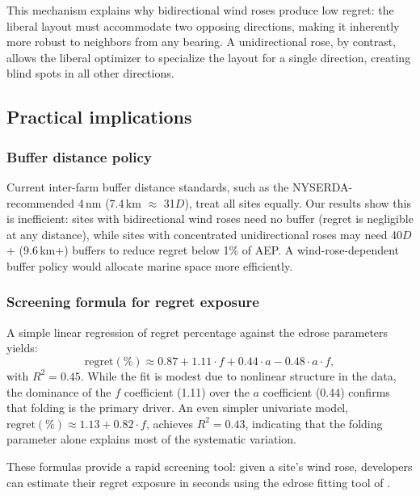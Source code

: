 \documentclass[manuscript, 12pt]{copernicus}
\begin{document}
This mechanism explains why bidirectional wind roses produce low regret: the liberal layout must accommodate two opposing directions, making it inherently more robust to neighbors from any bearing.
A unidirectional rose, by contrast, allows the liberal optimizer to specialize the layout for a single direction, creating blind spots in all other directions.

\subsection{Practical implications}

\subsubsection{Buffer distance policy}

Current inter-farm buffer distance standards, such as the NYSERDA-recommended 4\,nm (7.4\,km $\approx$ 31$D$), treat all sites equally.
Our results show this is inefficient: sites with bidirectional wind roses need no buffer (regret is negligible at any distance), while sites with concentrated unidirectional roses may need 40$D$+ (9.6\,km+) buffers to reduce regret below 1\% of AEP.
A wind-rose-dependent buffer policy would allocate marine space more efficiently.

\subsubsection{Screening formula for regret exposure}

A simple linear regression of regret percentage against the edrose parameters yields:
\begin{equation}\label{eq:regression}
    \text{regret}(\%) \approx 0.87 + 1.11 \cdot f + 0.44 \cdot a - 0.48 \cdot a \cdot f,
\end{equation}
with $R^2 = 0.45$.
While the fit is modest due to nonlinear structure in the data, the dominance of the $f$ coefficient (1.11) over the $a$ coefficient (0.44) confirms that folding is the primary driver.
An even simpler univariate model, $\text{regret}(\%) \approx 1.13 + 0.82 \cdot f$, achieves $R^2 = 0.43$, indicating that the folding parameter alone explains most of the systematic variation.

These formulas provide a rapid screening tool: given a site's wind rose, developers can estimate their regret exposure in seconds using the edrose fitting tool of \citet{Hart2025}.
\end{document}

